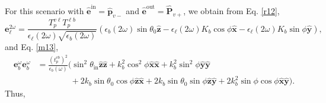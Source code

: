 For this scenario with $\hat{\mathbf{e}}^{\mathrm{in}}=\hat{\mathbf{p}}_{v-}$
and $\hat{\mathbf{e}}^{\mathrm{out}}=\hat{\mathbf{P}}_{v+}$, we obtain from Eq.
\eqref{r12},
\begin{equation*}\label{ri12}
\mathbf{e}^{2\omega}_{\ell} =
\frac{T^{v\ell}_{p}T^{\ell b}_{p}}
     {\epsilon_{\ell}({2\omega})\sqrt{\epsilon_{b}(2\omega)}}
\left(
  \epsilon_{b}(2\omega)\sin\theta_{0}\hat{\mathbf{z}}
- \epsilon_{\ell}(2\omega)K_{b}\cos\phi\hat{\mathbf{x}}
- \epsilon_{\ell}(2\omega)K_{b}\sin\phi\hat{\mathbf{y}}
\right),
\end{equation*}
and Eq. \eqref{m13},
\begin{equation*}
\begin{split}
\mathbf{e}^{\omega}_{b}\mathbf{e}^{\omega}_{b}
&= \frac{\left(t^{vb}_{p}\right)^{2}}{\epsilon_{b}(\omega)}
\big(
  \sin^{2}\theta_{\mathrm{in}}\hat{\mathbf{z}}\hat{\mathbf{z}}
+ k^{2}_{b}\cos^{2}\phi\hat{\mathbf{x}}\hat{\mathbf{x}}
+ k^{2}_{b}\sin^{2}\phi\hat{\mathbf{y}}\hat{\mathbf{y}}\\
&\qquad\qquad
+ 2k_{b}\sin\theta_{0}\cos\phi\hat{\mathbf{z}}\hat{\mathbf{x}}
+ 2k_{b}\sin\theta_{0}\sin\phi\hat{\mathbf{z}}\hat{\mathbf{y}}
+ 2k^{2}_{b}\sin\phi\cos\phi\hat{\mathbf{x}}\hat{\mathbf{y}}
\big).
\end{split}
\end{equation*}
Thus,
